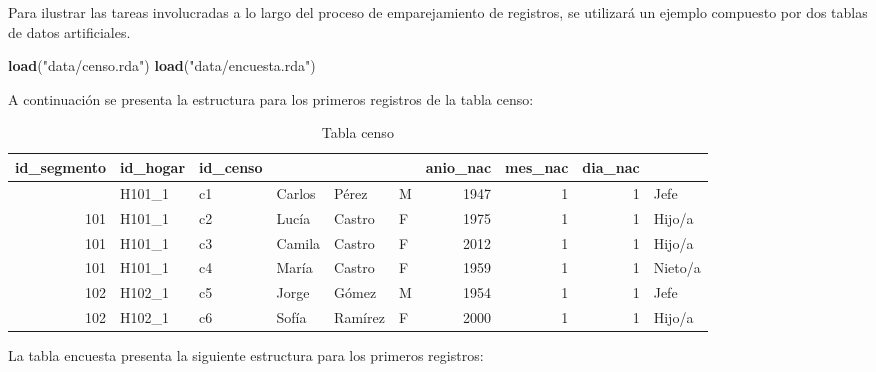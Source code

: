 \documentclass[
  12pt,
]{book}
\newenvironment{Shaded}{\begin{snugshade}}{\end{snugshade}}
\newcommand{\FunctionTok}[1]{\textcolor[rgb]{0.13,0.29,0.53}{\textbf{#1}}}
\newcommand{\NormalTok}[1]{#1}
\newcommand{\StringTok}[1]{\textcolor[rgb]{0.31,0.60,0.02}{#1}}
\begin{document}
Para ilustrar las tareas involucradas a lo largo del proceso de emparejamiento de registros, se utilizará un ejemplo compuesto por dos tablas de datos artificiales.

\begin{Shaded}
\begin{Highlighting}[]
\FunctionTok{load}\NormalTok{(}\StringTok{"data/censo.rda"}\NormalTok{)}
\FunctionTok{load}\NormalTok{(}\StringTok{"data/encuesta.rda"}\NormalTok{)}
\end{Highlighting}
\end{Shaded}

A continuación se presenta la estructura para los primeros registros de la tabla censo:

\begin{table}[t]
\caption*{
{\large Tabla censo}
} 
\fontsize{12.0pt}{14.4pt}\selectfont
\begin{tabular*}{\linewidth}{@{\extracolsep{\fill}}rlllllrrrl}
\toprule
id\_segmento & id\_hogar & id\_censo & {\bfseries \cellcolor[HTML]{F9F9F9}{nombre}} & {\bfseries \cellcolor[HTML]{F9F9F9}{apellido}} & {\bfseries \cellcolor[HTML]{F9F9F9}{sexo}} & anio\_nac & mes\_nac & dia\_nac & {\bfseries \cellcolor[HTML]{F9F9F9}{parentesco}} \\ 
\midrule\addlinespace[2.5pt]
101 & H101\_1 & c1 & Carlos & Pérez & M & 1947 & 1 & 1 & Jefe \\ 
101 & H101\_1 & c2 & Lucía & Castro & F & 1975 & 1 & 1 & Hijo/a \\ 
101 & H101\_1 & c3 & Camila & Castro & F & 2012 & 1 & 1 & Hijo/a \\ 
101 & H101\_1 & c4 & María & Castro & F & 1959 & 1 & 1 & Nieto/a \\ 
102 & H102\_1 & c5 & Jorge & Gómez & M & 1954 & 1 & 1 & Jefe \\ 
102 & H102\_1 & c6 & Sofía & Ramírez & F & 2000 & 1 & 1 & Hijo/a \\ 
\bottomrule
\end{tabular*}
\end{table}

La tabla encuesta presenta la siguiente estructura para los primeros registros:
\end{document}

